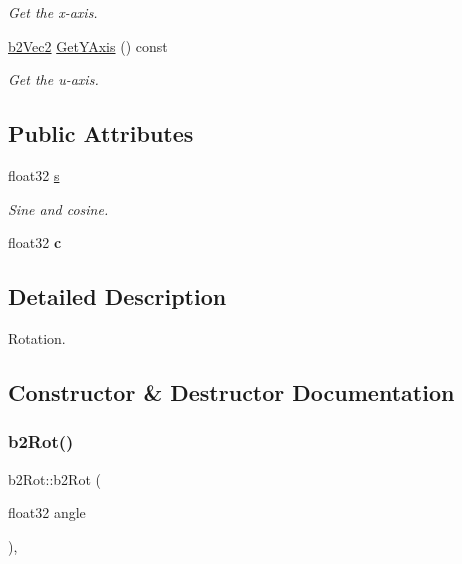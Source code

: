 \begin{DoxyCompactItemize}
\begin{DoxyCompactList}\small\item\em Get the x-\/axis. \end{DoxyCompactList}\item 
\mbox{\label{structb2_rot_ab057c4e9dc821099949391a6ded36dd6}} 
\hyperlink{structb2_vec2}{b2\+Vec2} \hyperlink{structb2_rot_ab057c4e9dc821099949391a6ded36dd6}{Get\+Y\+Axis} () const
\begin{DoxyCompactList}\small\item\em Get the u-\/axis. \end{DoxyCompactList}\end{DoxyCompactItemize}
\subsection*{Public Attributes}
\begin{DoxyCompactItemize}
\item 
\mbox{\label{structb2_rot_a15725ce0a89cc735ad90687b4c0f4dce}} 
float32 \hyperlink{structb2_rot_a15725ce0a89cc735ad90687b4c0f4dce}{s}
\begin{DoxyCompactList}\small\item\em Sine and cosine. \end{DoxyCompactList}\item 
\mbox{\label{structb2_rot_af23e5d31889dcb806ce46ce55aa81261}} 
float32 {\bfseries c}
\end{DoxyCompactItemize}


\subsection{Detailed Description}
Rotation. 

\subsection{Constructor \& Destructor Documentation}
\mbox{\label{structb2_rot_aa40dda6d390a2f54c793c63027a9b46e}} 
\subsubsection{\texorpdfstring{b2\+Rot()}{b2Rot()}}
{\footnotesize\ttfamily b2\+Rot\+::b2\+Rot (\begin{DoxyParamCaption}\item[{float32}]{angle }\end{DoxyParamCaption})\hspace{0.3cm}{\ttfamily [inline]}, {\ttfamily [explicit]}}



